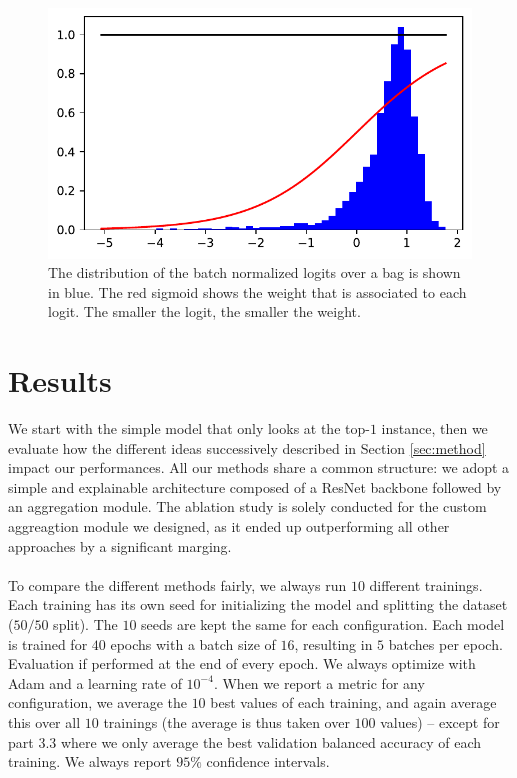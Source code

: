 \documentclass[final]{cvpr}
\begin{document}
	\begin{figure}[h!]
		\begin{center}
			\includegraphics[width=0.95\linewidth]{fig/aggreg_2.pdf}
		\end{center}
		\caption{The distribution of the batch normalized logits over a bag is shown in blue. The red sigmoid shows the weight that is associated to each logit. The smaller the logit, the smaller the weight.}
		\label{fig:aggreg}
	\end{figure}

	\section{Results}
	
	We start with the simple model that only looks at the top-$1$ instance, then we evaluate how the different ideas successively described in Section \ref{sec:method} impact our performances. All our methods share a common structure: we adopt a simple and explainable architecture composed of a ResNet \cite{resnet} backbone followed by an aggregation module. The ablation study is solely conducted for the custom aggreagtion module we designed, as it ended up outperforming all other approaches by a significant marging.\\
	\\
	To compare the different methods fairly, we always run $10$ different trainings. Each training has its own seed for initializing the model and splitting the dataset ($50/50$ split). The $10$ seeds are kept the same for each configuration. Each model is trained for $40$ epochs with a batch size of $16$, resulting in $5$ batches per epoch. Evaluation if performed at the end of every epoch. We always optimize with Adam and a learning rate of $10^{-4}$. When we report a metric for any configuration, we average the $10$ best values of each training, and again average this over all $10$ trainings (the average is thus taken over $100$ values) -- except for part 3.3 where we only average the best validation balanced accuracy of each training. We always report $95\%$ confidence intervals.
\end{document}
